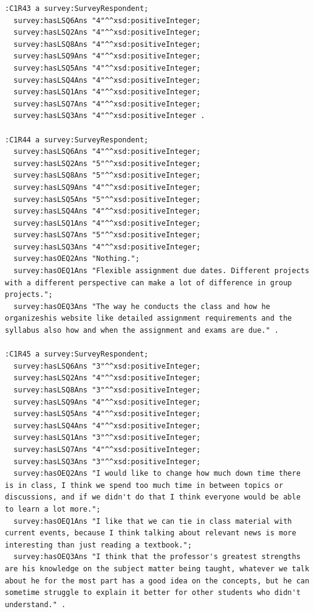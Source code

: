 \begin{lstlisting}
:C1R43 a survey:SurveyRespondent;
  survey:hasLSQ6Ans "4"^^xsd:positiveInteger;
  survey:hasLSQ2Ans "4"^^xsd:positiveInteger;
  survey:hasLSQ8Ans "4"^^xsd:positiveInteger;
  survey:hasLSQ9Ans "4"^^xsd:positiveInteger;
  survey:hasLSQ5Ans "4"^^xsd:positiveInteger;
  survey:hasLSQ4Ans "4"^^xsd:positiveInteger;
  survey:hasLSQ1Ans "4"^^xsd:positiveInteger;
  survey:hasLSQ7Ans "4"^^xsd:positiveInteger;
  survey:hasLSQ3Ans "4"^^xsd:positiveInteger .

:C1R44 a survey:SurveyRespondent;
  survey:hasLSQ6Ans "4"^^xsd:positiveInteger;
  survey:hasLSQ2Ans "5"^^xsd:positiveInteger;
  survey:hasLSQ8Ans "5"^^xsd:positiveInteger;
  survey:hasLSQ9Ans "4"^^xsd:positiveInteger;
  survey:hasLSQ5Ans "5"^^xsd:positiveInteger;
  survey:hasLSQ4Ans "4"^^xsd:positiveInteger;
  survey:hasLSQ1Ans "4"^^xsd:positiveInteger;
  survey:hasLSQ7Ans "5"^^xsd:positiveInteger;
  survey:hasLSQ3Ans "4"^^xsd:positiveInteger;
  survey:hasOEQ2Ans "Nothing.";
  survey:hasOEQ1Ans "Flexible assignment due dates. Different projects with a different perspective can make a lot of difference in group projects.";
  survey:hasOEQ3Ans "The way he conducts the class and how he organizeshis website like detailed assignment requirements and the syllabus also how and when the assignment and exams are due." .

:C1R45 a survey:SurveyRespondent;
  survey:hasLSQ6Ans "3"^^xsd:positiveInteger;
  survey:hasLSQ2Ans "4"^^xsd:positiveInteger;
  survey:hasLSQ8Ans "3"^^xsd:positiveInteger;
  survey:hasLSQ9Ans "4"^^xsd:positiveInteger;
  survey:hasLSQ5Ans "4"^^xsd:positiveInteger;
  survey:hasLSQ4Ans "4"^^xsd:positiveInteger;
  survey:hasLSQ1Ans "3"^^xsd:positiveInteger;
  survey:hasLSQ7Ans "4"^^xsd:positiveInteger;
  survey:hasLSQ3Ans "3"^^xsd:positiveInteger;
  survey:hasOEQ2Ans "I would like to change how much down time there is in class, I think we spend too much time in between topics or discussions, and if we didn't do that I think everyone would be able to learn a lot more.";
  survey:hasOEQ1Ans "I like that we can tie in class material with current events, because I think talking about relevant news is more interesting than just reading a textbook.";
  survey:hasOEQ3Ans "I think that the professor's greatest strengths are his knowledge on the subject matter being taught, whatever we talk about he for the most part has a good idea on the concepts, but he can sometime struggle to explain it better for other students who didn't understand." .


\end{lstlisting}
